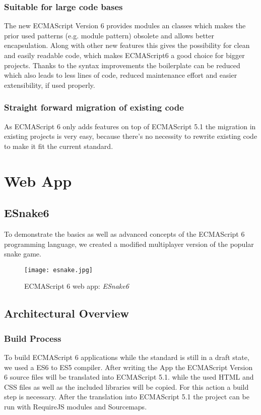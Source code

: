 \documentclass{bioinfo}
\begin{document}
\subsubsection{Suitable for large code bases}
The new ECMAScript Version 6 provides modules an classes which makes the prior used patterns (e.g. module pattern) obsolete
and allows better encapsulation. Along with other new features this gives the possibility for clean and easily readable code, 
which makes ECMAScript6 a good choice for bigger projects.
Thanks to the syntax improvements the boilerplate can be reduced which also leads to less lines of code,
reduced maintenance effort and easier extensibility, if used properly.
\subsubsection{Straight forward migration of existing code}
As ECMAScript 6 only adds features on top of ECMAScript 5.1 the migration in existing projects is very easy,
because there's no necessity to rewrite existing code to make it fit the current standard.  

\section{Web App}

\subsection{ESnake6}
To demonstrate the basics as well as advanced concepts of the ECMAScript 6 programming language, we created a modified multiplayer version of the 
popular snake game. 
 
\begin{figure}[!tpb]%
\centerline{\texttt{[image: esnake.jpg]}}
\caption{ECMAScript 6 web app: \textit{ESnake6}}\label{fig:03}
\end{figure}

\subsection{Architectural Overview}
\subsubsection{Build Process}
To build ECMAScript 6 applications while the standard is still in a draft state, we used a ES6 to ES5 compiler.
After writing the App the ECMAScript Version 6 source files will be translated into ECMAScript 5.1. while the 
used HTML and CSS files as well as the included libraries will be copied. For this action a build step is necessary. 
After the translation into ECMAScript 5.1 the project can be run with RequireJS modules and Sourcemaps.
\end{document}
